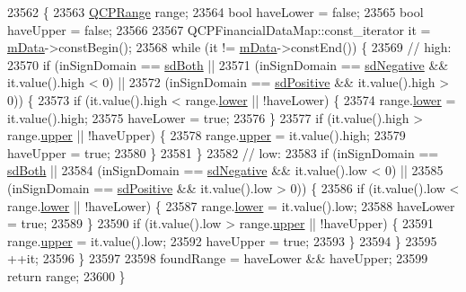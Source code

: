 \begin{DoxyCode}
23562                                                                          \{
23563   \hyperlink{class_q_c_p_range}{QCPRange} range;
23564   \textcolor{keywordtype}{bool} haveLower = \textcolor{keyword}{false};
23565   \textcolor{keywordtype}{bool} haveUpper = \textcolor{keyword}{false};
23566 
23567   QCPFinancialDataMap::const\_iterator it = \hyperlink{class_q_c_p_financial_a475f63587ca1077d8c30aaf2b71ae026}{mData}->constBegin();
23568   \textcolor{keywordflow}{while} (it != \hyperlink{class_q_c_p_financial_a475f63587ca1077d8c30aaf2b71ae026}{mData}->constEnd()) \{
23569     \textcolor{comment}{// high:}
23570     \textcolor{keywordflow}{if} (inSignDomain == \hyperlink{class_q_c_p_abstract_plottable_a661743478a1d3c09d28ec2711d7653d8a082b98cfb91a7363a3b5cd17b0c1cd60}{sdBoth} ||
23571         (inSignDomain == \hyperlink{class_q_c_p_abstract_plottable_a661743478a1d3c09d28ec2711d7653d8a0fc9a70796ef60ad18ddd18056e6dc63}{sdNegative} && it.value().high < 0) ||
23572         (inSignDomain == \hyperlink{class_q_c_p_abstract_plottable_a661743478a1d3c09d28ec2711d7653d8a02951859f243a4d24e779cfbb5471030}{sdPositive} && it.value().high > 0)) \{
23573       \textcolor{keywordflow}{if} (it.value().high < range.\hyperlink{class_q_c_p_range_aa3aca3edb14f7ca0c85d912647b91745}{lower} || !haveLower) \{
23574         range.\hyperlink{class_q_c_p_range_aa3aca3edb14f7ca0c85d912647b91745}{lower} = it.value().high;
23575         haveLower = \textcolor{keyword}{true};
23576       \}
23577       \textcolor{keywordflow}{if} (it.value().high > range.\hyperlink{class_q_c_p_range_ae44eb3aafe1d0e2ed34b499b6d2e074f}{upper} || !haveUpper) \{
23578         range.\hyperlink{class_q_c_p_range_ae44eb3aafe1d0e2ed34b499b6d2e074f}{upper} = it.value().high;
23579         haveUpper = \textcolor{keyword}{true};
23580       \}
23581     \}
23582     \textcolor{comment}{// low:}
23583     \textcolor{keywordflow}{if} (inSignDomain == \hyperlink{class_q_c_p_abstract_plottable_a661743478a1d3c09d28ec2711d7653d8a082b98cfb91a7363a3b5cd17b0c1cd60}{sdBoth} ||
23584         (inSignDomain == \hyperlink{class_q_c_p_abstract_plottable_a661743478a1d3c09d28ec2711d7653d8a0fc9a70796ef60ad18ddd18056e6dc63}{sdNegative} && it.value().low < 0) ||
23585         (inSignDomain == \hyperlink{class_q_c_p_abstract_plottable_a661743478a1d3c09d28ec2711d7653d8a02951859f243a4d24e779cfbb5471030}{sdPositive} && it.value().low > 0)) \{
23586       \textcolor{keywordflow}{if} (it.value().low < range.\hyperlink{class_q_c_p_range_aa3aca3edb14f7ca0c85d912647b91745}{lower} || !haveLower) \{
23587         range.\hyperlink{class_q_c_p_range_aa3aca3edb14f7ca0c85d912647b91745}{lower} = it.value().low;
23588         haveLower = \textcolor{keyword}{true};
23589       \}
23590       \textcolor{keywordflow}{if} (it.value().low > range.\hyperlink{class_q_c_p_range_ae44eb3aafe1d0e2ed34b499b6d2e074f}{upper} || !haveUpper) \{
23591         range.\hyperlink{class_q_c_p_range_ae44eb3aafe1d0e2ed34b499b6d2e074f}{upper} = it.value().low;
23592         haveUpper = \textcolor{keyword}{true};
23593       \}
23594     \}
23595     ++it;
23596   \}
23597 
23598   foundRange = haveLower && haveUpper;
23599   \textcolor{keywordflow}{return} range;
23600 \}
\end{DoxyCode}
